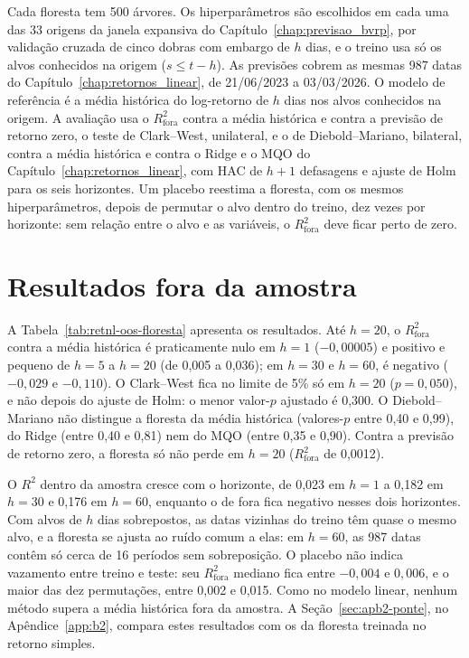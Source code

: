 Cada floresta tem 500 árvores. Os hiperparâmetros são escolhidos em cada uma
das 33 origens da janela expansiva do Capítulo~\ref{chap:previsao_bvrp}, por
validação cruzada de cinco dobras com embargo de $h$ dias, e o treino usa só
os alvos conhecidos na origem ($s \le t-h$). As previsões cobrem as mesmas
987 datas do Capítulo~\ref{chap:retornos_linear}, de 21/06/2023 a 03/03/2026.
O modelo de referência é a média histórica do log-retorno de $h$ dias nos
alvos conhecidos na origem. A avaliação usa o $R^2_{\text{fora}}$ contra a
média histórica e contra a previsão de retorno zero, o teste de Clark--West,
unilateral, e o de Diebold--Mariano, bilateral, contra a média histórica e
contra o Ridge e o MQO do Capítulo~\ref{chap:retornos_linear}, com HAC de
$h+1$ defasagens e ajuste de Holm para os seis horizontes. Um placebo
reestima a floresta, com os mesmos hiperparâmetros, depois de permutar o alvo
dentro do treino, dez vezes por horizonte: sem relação entre o alvo e as
variáveis, o $R^2_{\text{fora}}$ deve ficar perto de zero.

\section{Resultados fora da amostra}
\label{sec:retnl-oos}

A Tabela~\ref{tab:retnl-oos-floresta} apresenta os resultados. Até
$h = 20$, o $R^2_{\text{fora}}$ contra a média histórica é praticamente nulo
em $h = 1$ ($-0{,}00005$) e positivo e pequeno de $h = 5$ a $h = 20$ (de
0,005 a 0,036); em $h = 30$ e $h = 60$, é
negativo ($-0{,}029$ e $-0{,}110$). O Clark--West fica no limite de 5\% só
em $h = 20$ ($p = 0{,}050$), e não depois do ajuste de Holm: o menor
valor-$p$ ajustado é 0,300. O Diebold--Mariano não distingue a floresta da
média histórica (valores-$p$ entre 0,40 e 0,99), do Ridge (entre 0,40 e
0,81) nem do MQO (entre 0,35 e 0,90). Contra a previsão de retorno zero, a
floresta só não perde em $h = 20$ ($R^2_{\text{fora}}$ de 0,0012).



O $R^2$ dentro da amostra cresce com o horizonte, de 0,023 em $h = 1$ a
0,182 em $h = 30$ e 0,176 em $h = 60$, enquanto o de fora fica negativo
nesses dois horizontes. Com alvos de $h$ dias sobrepostos, as datas vizinhas
do treino têm quase o mesmo alvo, e a floresta se ajusta ao ruído comum a
elas: em $h = 60$, as 987 datas contêm só cerca de 16 períodos sem
sobreposição. O placebo não indica vazamento entre treino e teste: seu
$R^2_{\text{fora}}$ mediano fica entre $-0{,}004$ e $0{,}006$, e o maior das
dez permutações, entre 0,002 e 0,015. Como no modelo linear, nenhum método
supera a média histórica fora da amostra. A Seção~\ref{sec:apb2-ponte}, no
Apêndice~\ref{app:b2}, compara estes resultados com os da floresta treinada
no retorno simples.

